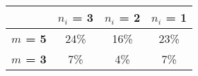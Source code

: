\begin{tabular}{|l|c|c|c|}
\hline
&\textbf{$n_i$ = 3}&\textbf{$n_i$ = 2}&\textbf{$n_i$ = 1}\\\hline
\textbf{$m$ = 5}&24\%&16\%&23\%\\\hline
\textbf{$m$ = 3}&7\%&4\%&7\%\\\hline
\end{tabular}
